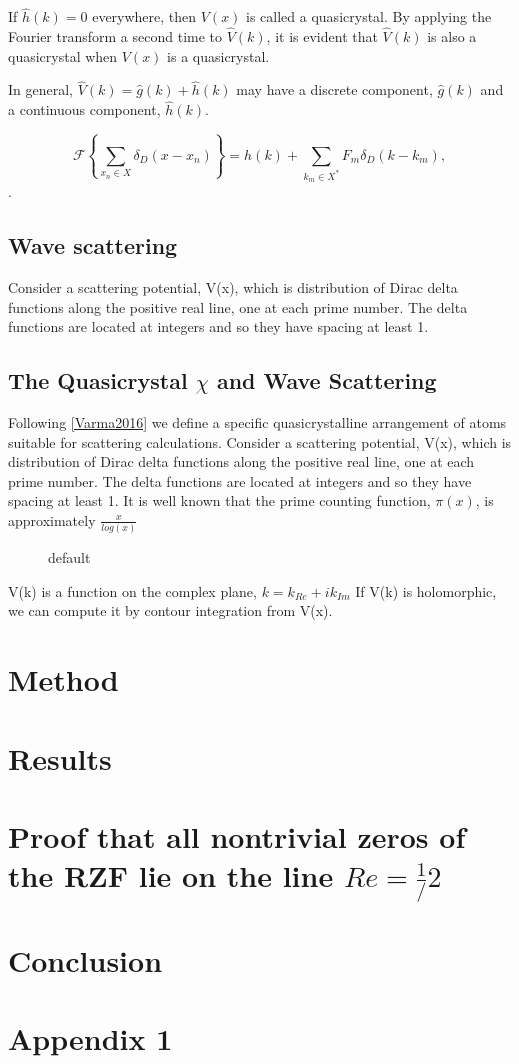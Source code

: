 \documentclass[11pt, oneside]{article}   	%
\begin{document}
If $\hat{h}(k) = 0$ everywhere, then $V(x)$ is called a quasicrystal.
By applying the Fourier transform a second time to $\hat{V}(k)$, it is evident that $\hat{V}(k)$ is also a quasicrystal when $V(x)$ is a quasicrystal. 






In general, $\hat{V}(k) =\hat{g}(k) + \hat{h}(k)$ may have a discrete component, $\hat{g}(k)$  and a continuous component, $\hat{h}(k)$.

\begin{equation}
 \label{eq: RiemannFourier}
 \mathcal{F}\left \{ \sum_{x_n \in X}\delta_D(x - x_n) \right \} = h(k) +  \sum_{k_m \in X^{*}} F_{m} \delta_D(k - k_{m}),
\end{equation}.


\subsection{Wave scattering}
Consider a scattering potential, V(x), which is distribution of Dirac delta functions along the positive real line, one at each prime number. 
The delta functions are located at integers and so they have spacing at least 1.

\subsection{The Quasicrystal $\chi$ and Wave Scattering}
Following \ref{Varma2016} we define a specific quasicrystalline arrangement of atoms suitable for scattering calculations.
Consider a scattering potential, V(x), which is distribution of Dirac delta functions along the positive real line, one at each prime number. 
The delta functions are located at integers and so they have spacing at least 1.
It is well known that the prime counting function, $\pi(x)$, is approximately $\frac{x}{log(x)}$

\begin{figure}[htbp]
\begin{center}

\caption{default}
\label{default}
\end{center}
\end{figure}


V(k) is a function on the complex plane, $k = k_{Re} + ik_{Im}$
If V(k) is holomorphic, we can compute it by contour integration from V(x).


\section{Method}
\section{Results}
\section{Proof that all nontrivial zeros of the RZF lie on the line $Re = \frac{1}/{2}$}
\section{Conclusion}
\section{Appendix 1}
\end{document}
